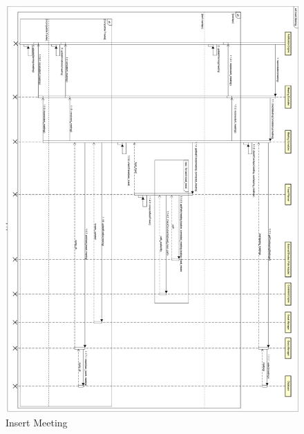 
\begin{figure}[h]
	\centering\includegraphics[width = \textwidth]{Images/RuntimeDiagrams/InsertMeetingOrizzontale.png}
	\caption{Insert Meeting}
\end{figure}

